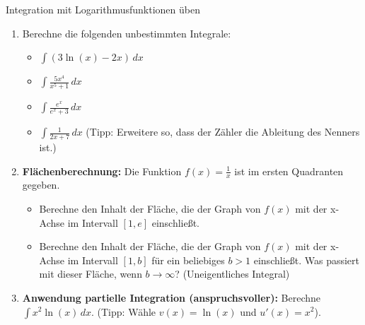 \begin{aufgabenumgebung}{Integration mit Logarithmusfunktionen üben}
\begin{enumerate}
    \item Berechne die folgenden unbestimmten Integrale:
        \begin{itemize}
            \item $\int (3\ln(x) - 2x) \,dx$
            \item $\int \frac{5x^4}{x^5+1} \,dx$
            \item $\int \frac{e^x}{e^x+3} \,dx$
            \item $\int \frac{1}{2x+7} \,dx$ (Tipp: Erweitere so, dass der Zähler die Ableitung des Nenners ist.)
        \end{itemize}
    \item \textbf{Flächenberechnung:}
        Die Funktion $f(x) = \frac{1}{x}$ ist im ersten Quadranten gegeben.
        \begin{itemize}
            \item Berechne den Inhalt der Fläche, die der Graph von $f(x)$ mit der x-Achse im Intervall $[1, e]$ einschließt.
            \item Berechne den Inhalt der Fläche, die der Graph von $f(x)$ mit der x-Achse im Intervall $[1, b]$ für ein beliebiges $b>1$ einschließt. Was passiert mit dieser Fläche, wenn $b \to \infty$? (Uneigentliches Integral)
        \end{itemize}
    \item \textbf{Anwendung partielle Integration (anspruchsvoller):}
        Berechne $\int x^2 \ln(x) \,dx$. (Tipp: Wähle $v(x)=\ln(x)$ und $u'(x)=x^2$).
\end{enumerate}
\end{aufgabenumgebung}



